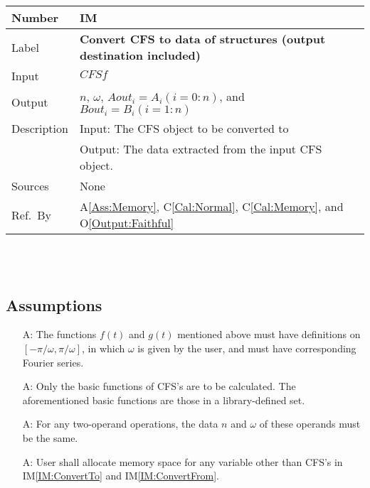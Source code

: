 \documentclass[12pt]{article}
\newcommand{\colAwidth}{0.13\textwidth}
\newcommand{\colBwidth}{0.82\textwidth}
\newcounter{assumpnum} %
\newcommand{\aref}[1]{A\ref{#1}}
\newcommand{\calref}[1]{C\ref{#1}}
\newcommand{\oref}[1]{O\ref{#1}}
\newcounter{instnum} %
\newcommand{\iref}[1]{IM\ref{#1}}
\begin{document}
\noindent
\begin{minipage}{\textwidth}
	\renewcommand*{\arraystretch}{1.5}
	\begin{tabular}{| p{\colAwidth} | p{\colBwidth}|}
		\hline
		\rowcolor[gray]{0.9}
		Number& IM{instnum}\theinstnum \label{IM:ConvertFrom}\\
		\hline
		Label& \bf Convert CFS to data of structures (output destination included) \\
		\hline
		Input& $\mathit{CFSf}$\\
		\hline
		Output& $n$, $\omega$, $\mathit{Aout}_{i}=A_i (i=0:n)$, and $\mathit{Bout}_{i}=B_i (i=1:n)$\\
		\hline
		Description&Input: The CFS object to be converted to\\
		&Output: The data extracted from the input CFS object.\\
		\hline
		Sources&None\\
		\hline
		Ref.\ By &   \aref{Ass:Memory}, \calref{Cal:Normal}, \calref{Cal:Memory}, and \oref{Output:Faithful}\\
		\hline
	\end{tabular}
\end{minipage}\\
~\newline

\subsection{Assumptions}

\begin{itemize}

\item[A\refstepcounter{assumpnum}\theassumpnum \label{Ass:FunctionProperty}:] The functions $f(t)$ and $g(t)$ mentioned above must have definitions on $[-\pi/\omega, \pi/\omega]$, in which $\omega$ is given by the user, and must have corresponding Fourier series.
\item[A\refstepcounter{assumpnum}\theassumpnum \label{Ass:BasicFunction}:] Only the basic functions of CFS's are to be calculated. The aforementioned basic functions are those in a library-defined set.
\item[A\refstepcounter{assumpnum}\theassumpnum \label{Ass:CFSPropertyMatch}:] For any two-operand operations, the data $n$ and $\omega$ of these operands must be the same. 
\item[A\refstepcounter{assumpnum}\theassumpnum \label{Ass:Memory}:] User shall allocate memory space for any variable other than CFS's in \iref{IM:ConvertTo} and \iref{IM:ConvertFrom}.
\end{itemize}
\end{document}
